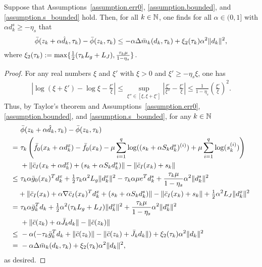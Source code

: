 \begin{lemma}\label{lemma.dec_phi_delta_m}
  Suppose that Assumptions~\ref{assumption.err0}, \ref{assumption.bounded}, and \ref{assumption.s_bounded}  hold.  Then, for all $k \in \mathbb{N}$, one finds for all $\alpha \in (0, 1]$ with $\alpha d_k^s \geq -\eta_s$ that
  \begin{equation*}
    {\bar \phi}(z_k+\alpha {\hat d}_k, \tau_k) - {\bar \phi}(z_k, \tau_k) \leq - \alpha \Delta {\bar m}_k(d_k, \tau_k) + \xi_2(\tau_k) \alpha^2 \|d_k\|^2,
  \end{equation*}
  where $\xi_2(\tau_k) := \max \{\tfrac{1}{2}(\tau_k L_g + L_J), \frac{\tau_k \mu}{1-\eta_s} \}$.
\end{lemma}
\begin{proof}
  For any real numbers $\xi$ and $\xi'$ with $\xi > 0$ and $\xi' \geq -\eta_s \xi$, one has
  \begin{align*}
    \left|\log(\xi + \xi') - \log \xi - \frac{\xi'}{\xi} \right| \leq \sup_{\xi'' \in [\xi,\xi+\xi']}\left| \frac{\xi'}{\xi''} - \frac{\xi'}{\xi} \right| \leq \frac{1}{1 - \eta_s} \left(\frac{\xi'}{\xi}\right)^2.
  \end{align*}
  Thus, by Taylor's theorem and Assumptions~\ref{assumption.err0}, \ref{assumption.bounded}, and \ref{assumption.s_bounded}, for any $k \in \mathbb{N}$
  \begin{align*}
    &\  {\bar \phi}(z_k+\alpha {\hat d}_k, \tau_k) - {\bar \phi}(z_k, \tau_k) \\
    =&\ \tau_k \left({\bar f}_0(x_k + \alpha d_k^x) - {\bar f}_0(x_k) - \mu \sum_{i=1}^q \log((s_k + \alpha S_k d_k^s)^{(i)}) + \mu \sum_{i=1}^q \log(s_k^{(i)}) \right) \\
    &\ + \| {\bar c}_I(x_k + \alpha d_k^x) + (s_k + \alpha S_k d_k^s) \| - \| {\bar c}_I(x_k) + s_k \| \\
    \leq&\ \tau_k \alpha {\bar g}_0(x_k)^T d_k^x + \tfrac{1}{2}\tau_k \alpha^2 L_g \|d_k^x\|^2 - \tau_k\alpha \mu e^T d_k^s + \frac{\tau_k \mu}{1 - \eta_s} \alpha^2 \|d_k^s\|^2 \\
    &+ \|{\bar c}_I(x_k) + \alpha \nabla {\bar c}_I(x_k)^T d_k^x + (s_k + \alpha S_k d_k^s) \| - \|{\bar c}_I(x_k) + s_k\| + \tfrac{1}{2} \alpha^2 L_J \|d_k^x\|^2 \\
    =&\ \tau_k \alpha {\bar g}_k^T d_k + \tfrac{1}{2} \alpha^2 (\tau_k  L_g + L_J ) \|d_k^x\|^2  + \frac{\tau_k \mu}{1 - \eta_s} \alpha^2 \|d_k^s\|^2 \\
    &\ + \|{\bar c}(z_k) + \alpha {\bar J}_k d_k \| - \|{\bar c}(z_k)\| \\ 
    \leq&\ -\alpha (-\tau_k  {\bar g}_k^T d_k + \|{\bar c}(z_k) \| - \|{\bar c}(z_k) + {\bar J}_k d_k\| ) + \xi_2(\tau_k) \alpha^2 \|d_k\|^2\\
    =&\ -\alpha \Delta {\bar m}_k(d_k, \tau_k) + \xi_2(\tau_k) \alpha^2 \|d_k\|^2,
  \end{align*}
  as desired.
\end{proof}

